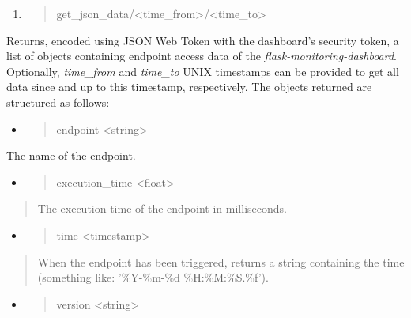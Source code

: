 \begin{enumerate}
\def\labelenumi{\arabic{enumi}.}
\setcounter{enumi}{1}
\item
  \begin{quote}
  get\_json\_data/\textless{}time\_from\textgreater{}/\textless{}time\_to\textgreater{}
  \end{quote}
\end{enumerate}

Returns, encoded using JSON Web Token with the dashboard's security
token, a list of objects containing endpoint access data of the
\emph{flask-monitoring-dashboard}. Optionally, \emph{time\_from} and
\emph{time\_to} UNIX timestamps can be provided to get all data since
and up to this timestamp, respectively. The objects returned are
structured as follows:

\begin{itemize}
\item
  \begin{quote}
  endpoint \textless{}string\textgreater{}
  \end{quote}
\end{itemize}

The name of the endpoint.

\begin{itemize}
\item
  \begin{quote}
  execution\_time \textless{}float\textgreater{}
  \end{quote}
\end{itemize}

\begin{quote}
The execution time of the endpoint in milliseconds.
\end{quote}

\begin{itemize}
\item
  \begin{quote}
  time \textless{}timestamp\textgreater{}
  \end{quote}
\end{itemize}

\begin{quote}
When the endpoint has been triggered, returns a string containing the
time (something like: '\%Y-\%m-\%d \%H:\%M:\%S.\%f').
\end{quote}

\begin{itemize}
\item
  \begin{quote}
  version \textless{}string\textgreater{}
  \end{quote}
\end{itemize}

